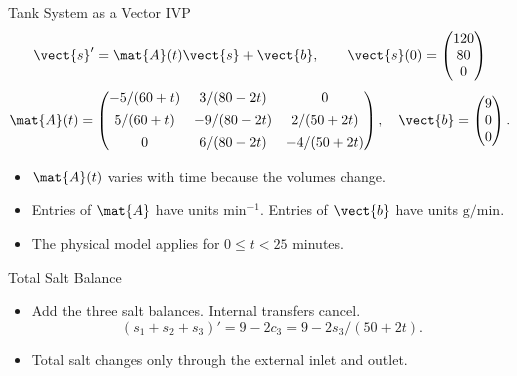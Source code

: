 \begin{frame}{Tank System as a Vector IVP}
\[
  \vect{s}'=\mat{A}(t)\vect{s}+\vect{b},\qquad
  \vect{s}(0)=\begin{pmatrix}120\\80\\0\end{pmatrix}
\]
\[
\mat{A}(t)=\begin{pmatrix}
  -5/(60+t)&3/(80-2t)&0\\[4pt]
  5/(60+t)&-9/(80-2t)&2/(50+2t)\\[4pt]
  0&6/(80-2t)&-4/(50+2t)
\end{pmatrix},\quad
\vect{b}=\begin{pmatrix}9\\0\\0\end{pmatrix}.
\]
\begin{itemize}
  \item $\mat{A}(t)$ varies with time because the volumes change.
  \item Entries of $\mat{A}$ have units $\mathrm{min}^{-1}$.
  Entries of $\vect{b}$ have units $\mathrm{g/min}$.
  \item The physical model applies for $0\leq t<25$ minutes.
\end{itemize}
\end{frame}

\begin{frame}{Total Salt Balance}
\begin{itemize}
  \item Add the three salt balances. Internal transfers cancel.
  \[
    (s_1+s_2+s_3)'=9-2c_3=9-2s_3/(50+2t).
  \]
  \item Total salt changes only through the external inlet and outlet.
\end{itemize}
\end{frame}
